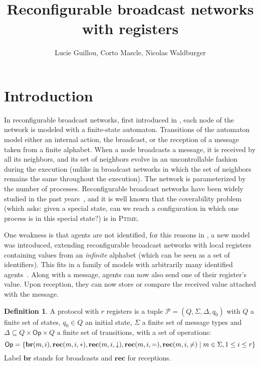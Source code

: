 \documentclass{article}
\title{Reconfigurable broadcast networks with registers}
\author{Lucie Guillou, Corto Mascle, Nicolas Waldburger}
\date{}
\newcommand{\set}[1]{\{#1\}}
\theoremstyle{definition}
\newtheorem{definition}[theorem]{Definition}
\begin{document}
	
	\maketitle
	
	\section{Introduction} 
	
	In reconfigurable broadcast networks, first introduced in \cite{DelzannoSZ2010Adhoc}, each node of the network is modeled with a finite-state automaton. Transitions of the automaton model either an internal action, the broadcast, or the reception of a message taken from a finite alphabet. When a node broadcasts a message, it is received by all its neighbors, and its set of neighbors evolve in an uncontrollable fashion during the execution (unlike in broadcast networks \cite{BZ83} in which the set of neighbors remains the same throughout the execution). The network is parameterized by the number of processes. Reconfigurable broadcast networks have been widely studied in the past years~\cite{Balasubramanian18, BalasubramanianGW22}, and it is well known that the coverability problem (which asks: given a special state, can we reach a configuration in which one process is in this special state?) is in \textsc{Ptime}.
	
	One weakness is that agents are not identified, for this reasons in \cite{DelzannoST13}, a new model was introduced, extending reconfigurable broadcast networks with local registers containing values from an \emph{infinite} alphabet (which can be seen as a set of identifiers). This fits in a family of models with arbitrarily many identified agents~\cite{AbdullaAKR14}. Along with a message, agents can now also send one of their register's value. Upon reception, they can now store or compare the received value attached with the message.
	
	
	\begin{definition}
		A protocol with $r$ registers is a tuple $\mathcal{P} = (Q, \Sigma, \Delta, q_0)$  with $Q$ a finite set of states, $q_0 \in Q$ an initial state, $\Sigma$ a finite set of message types  and $\Delta \subseteq Q \times \mathsf{Op} \times Q$ a finite set of transitions, with a set of operations:\vspace{-0.3cm} \[\mathsf{Op} = \set{\mathbf{br}(m,i), \mathbf{rec}(m,i, \ast), \mathbf{rec}(m,i, \downarrow), \mathbf{rec}(m,i, =),\mathbf{rec}(m,i, \neq) \mid m \in \Sigma, 1 \leq i \leq r}\vspace{-0.3cm}\]
		Label $\mathbf{br}$ stands for broadcasts and $\mathbf{rec}$ for receptions.
		
	\end{definition}
	
\end{document}
